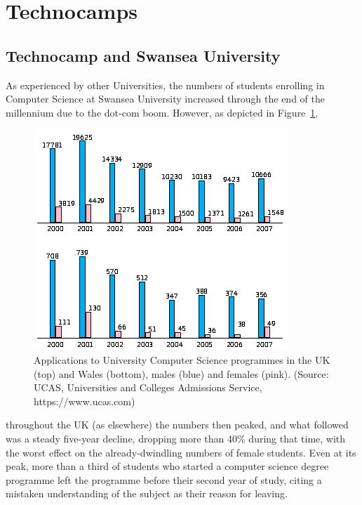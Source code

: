 \documentclass{sig-alternate}
\begin{document}
\section{Technocamps}

\subsection{Technocamp and Swansea University}
As experienced by other Universities,
the numbers of students enrolling in Computer Science
at Swansea University increased through the end
of the millennium due to the dot-com boom.
However, as depicted in Figure~\ref{fig:numbers},
\begin{figure}
  \centering
  \includegraphics[width=0.9\columnwidth]{images/numbers.png}
  \caption{Applications to University Computer Science programmes
           in the UK (top) and Wales (bottom), males (blue) and females (pink).
           (Source: UCAS, Universities and Colleges Admissions Service,
            https://www.ucas.com)}
  \label{fig:numbers}
\end{figure}
throughout the UK (as elsewhere) the numbers then peaked, and what followed
was a steady five-year decline, dropping more than 40\% during that time,
with the worst effect on the already-dwindling numbers
of female students.
Even at its peak, more than a third of students who
started a computer science degree programme left
the programme before their second year of study,
citing a mistaken understanding of the subject
as their reason for leaving.
\end{document}
